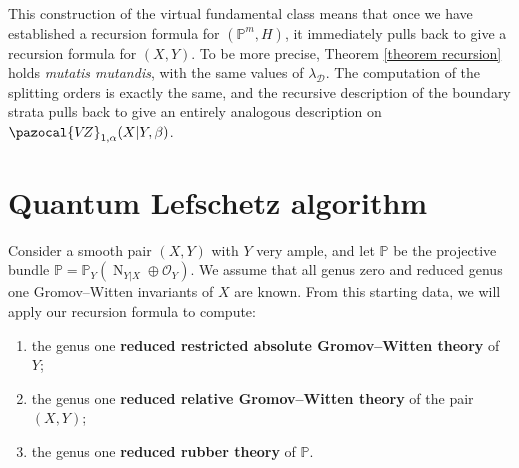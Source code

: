 \documentclass[11pt]{amsart}
\newcommand{\PP}{\mathbb P}
\newcommand{\VZ}{\pazocal{V\!Z}}
\newcommand{\OO}{\mathcal{O}}
\newcommand{\Dcal}{\mathcal{D}}
\theoremstyle{definition}
\theoremstyle{definition}
\begin{document}
This construction of the virtual fundamental class means that once we have established a recursion formula for $(\PP^m,H)$, it immediately pulls back to give a recursion formula for $(X,Y)$. To be more precise, Theorem \ref{theorem recursion} holds \emph{mutatis mutandis}, with the same values of $\lambda_\Dcal$. The computation of the splitting orders is exactly the same, and the recursive description of the boundary strata pulls back to give an entirely analogous description on $\VZ_{1,\alpha}(X|Y,\beta)$.


\section{Quantum Lefschetz algorithm}\label{section recursion algorithm}
\noindent Consider a smooth pair $(X,Y)$ with $Y$ very ample, and let $\mathbb{P}$ be the projective bundle $\mathbb{P}=\PP_Y(\operatorname{N}_{Y|X} \oplus\OO_Y)$. We assume that all genus zero and reduced genus one Gromov--Witten invariants of $X$ are known. From this starting data, we will apply our recursion formula to compute:
\begin{enumerate}
\item the genus one \textbf{reduced restricted absolute Gromov--Witten theory} of $Y$;
\item the genus one \textbf{reduced relative Gromov--Witten theory} of the pair $(X,Y)$;
\item the genus one \textbf{reduced rubber theory} of $\mathbb{P}$.
\end{enumerate}
\end{document}

